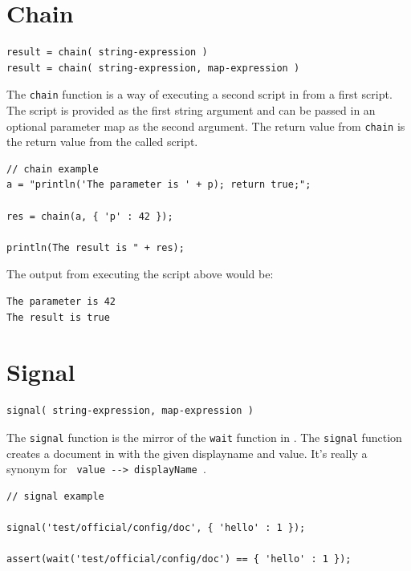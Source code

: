 \section{Chain}

\begin{verbatim}
result = chain( string-expression )
result = chain( string-expression, map-expression )
\end{verbatim}

The \verb+chain+ function is a way of executing a second script in \Reflex from a first script. The script is provided as the first string argument and can be passed in an optional parameter map as the second argument. The return value from \verb+chain+ is the return value from the called script.

\begin{lstlisting}[caption={Chain example}]
// chain example
a = "println('The parameter is ' + p); return true;";

res = chain(a, { 'p' : 42 });

println(The result is " + res);

\end{lstlisting}

The output from executing the script above would be:
\begin{verbatim}
The parameter is 42
The result is true
\end{verbatim}

\section{Signal}

\begin{verbatim}
signal( string-expression, map-expression )
\end{verbatim}

The \verb+signal+ function is the mirror of the \verb+wait+ function in \Reflex. The \verb+signal+ function creates a document in \Rapture with the given displayname and value. It's really a synonym for \verb+ value --> displayName +.

\begin{lstlisting}[caption={Signal example}]
// signal example

signal('test/official/config/doc', { 'hello' : 1 });

assert(wait('test/official/config/doc') == { 'hello' : 1 });

\end{lstlisting}

